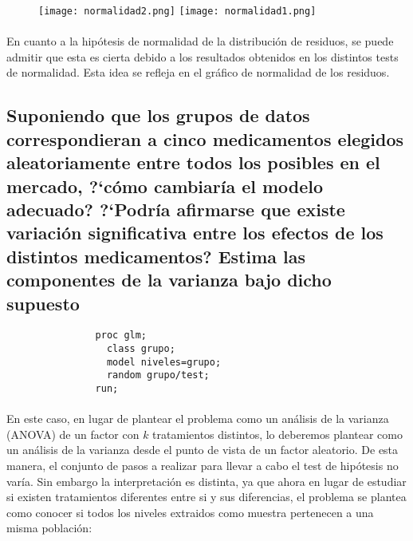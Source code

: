 \documentclass{article}
\begin{document}
      \begin{figure}[H]
        \centering
        \texttt{[image: normalidad2.png]}
        \texttt{[image: normalidad1.png]}
      \end{figure}

      \paragraph{}
      En cuanto a la hipótesis de normalidad de la distribución de residuos, se puede admitir que esta es cierta debido a los resultados obtenidos en los distintos tests de normalidad. Esta idea se refleja en el gráfico de normalidad de los residuos.


    \subsection{Suponiendo que los grupos de datos correspondieran a cinco medicamentos elegidos aleatoriamente entre todos los posibles en el mercado, ?`cómo cambiaría el modelo adecuado? ?`Podría afirmarse que existe variación significativa entre los efectos de los distintos medicamentos? Estima las componentes de la varianza bajo dicho supuesto}


      \begin{figure}[h]
        \centering
        \begin{verbatim}
          proc glm;
            class grupo;
            model niveles=grupo;
            random grupo/test;
          run;
        \end{verbatim}
        \label{code:sas_8}
      \end{figure}

      \paragraph{}
      En este caso, en lugar de plantear el problema como un análisis de la varianza (ANOVA) de un factor con $k$ tratamientos distintos, lo deberemos plantear como un análisis de la varianza desde el punto de vista de un factor aleatorio. De esta manera, el conjunto de pasos a realizar para llevar a cabo el test de hipótesis no varía. Sin embargo la interpretación es distinta, ya que ahora en lugar de estudiar si existen tratamientos diferentes entre si y sus diferencias, el problema se plantea como conocer si todos los niveles extraidos como muestra pertenecen a una misma población:
\end{document}
